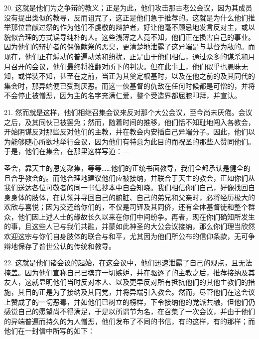 20. 这就是他们为之争辩的教义；正是为此，他们攻击那古老公会议，因为其成员没有提出类似的教导，反而诅咒了，这正是他们急于推荐的。这就是为什么他们推举那位曾献过祭的作为他们不虔敬的辩护者，好让他毫不顾忌地发言反对主，或以貌似合理的方式误导纯朴的人。这些浅薄之人竟不知，他们正在损害自己的事业。因为他们的辩护者的偶像献祭的恶臭，更清楚地泄露了这异端是与基督为敌的。而现在，他们正在煽动的普遍动荡和纷扰，正是由于他们相信，通过众多的谋杀和月月召开的会议，他们最终将推翻对所下的判决。但在此事上，他们似乎也愚昧无知，或佯装不知，甚至在之前，当正为其奠定根基时，以及在他之前的及其同代的集会时，那异端便已受到厌恶。而这一伙基督的仇敌在任何时候都是可憎的，并将不会停止被憎恶，因为主的名字充满仁爱，整个受造界都屈膝叩拜，并宣认。\par

21. 然而就是这样，他们相继召集会议来反对那个大公会议，至今尚未厌倦。会议之后，及其同伙已被罢免；然而，随着时间的推移，他们恬不知耻地闯入各教会，开始阴谋反对那些反对他们的主教，并在教会内安插自己异端分子。因此，他们以为能够随心所欲地举行会议，因为他们有特意为此目的而祝圣的那些人赞同他们。于是，他们在集会，在那里这样写道：—\par

圣会，靠天主的恩宠聚集，等等……他们的正统书面教导，我们全都承认是健全的且合乎教会的。而他合理地建议他们应被接纳，并联合于天主的教会，正如你们从我们送达各位可敬者的同一书信抄本中自会知晓。我们相信你们自己，好像找回自身身体的肢体，在认领并寻回自己的腑脏、自己的弟兄和父亲时，必将经历极大的欢欣与喜悦；因为交还给你们的，不仅是司铎及其同侪，还有全体基督徒和整个群众，他们因上述人士的缘故长久以来在你们中间纷争。再者，现在你们确知所发生的事，且这些人已与我们共融，并蒙如此神圣的大公会议接纳，那么你们理当欣然欢迎这宗与你们自身肢体的联合与和平，尤其因为他们所公布的信仰条款，无可争辩地保存了普世公认的传统和教导。\par

22. 这就是他们诸会议的起始，在这会议中，他们迅速泄露了自己的观点，且无法掩盖。因为他们宣称自己已摈弃一切嫉妒，并在驱逐了的主教之后，推荐接纳及其友人，这就显明他们当时反对本人、以及更早反对所有抵抗他们的其他主教们的措施，其目的正是为了接纳及其同党，并将异端引入教会。然而，尽管他们在这会议上赞成了的一切恶毒，并如他们已树立的榜样，下令接纳他的党派共融，但他们仍感觉自己的愿望尚不得满足，于是以所谓节为名，在召集了一次会议，并由于他们的异端普遍而持久的为人憎恶，他们发布了不同的书信，有的这样，有的那样；而他们在一封信中所写的如下：\par

